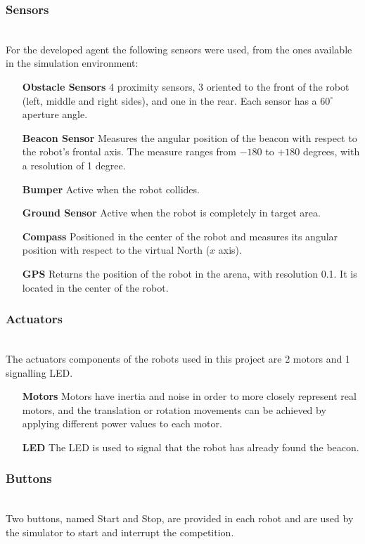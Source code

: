 \documentclass[oribibl]{llncs}
\begin{document}
\subsubsection{Sensors}\hfill \\
For the developed agent the following sensors were used, from the ones available in the simulation environment: 
\begin{itemize}
  \item[\textbf{Obstacle Sensors}]
  4 proximity sensors, 3 oriented to the front of the robot (left, middle and right sides), and one in the rear. Each sensor has a $60^{\circ}$ aperture angle.
  \item[\textbf{Beacon Sensor}]
  Measures the angular position of the beacon with respect to the robot's frontal axis. The measure ranges from $-180$ to $+180$ degrees, with a resolution of 1 degree.
  \item[\textbf{Bumper}]Active when the robot collides.
  \item[\textbf{Ground Sensor}]
  Active when the robot is completely in target area.
  \item[\textbf{Compass}]
  Positioned in the center of the robot and measures its angular position with respect to
the virtual North ($x$ axis).
  \item[\textbf{GPS}]
  Returns the position of the robot in the arena, with resolution 0.1. It is located in the center of the robot.
\end{itemize}

\subsubsection{Actuators}\hfill \\
The actuators components of the robots used in this project are 2 motors and 1 signalling LED. 
\begin{itemize}
  \item[\textbf{Motors}]
Motors have inertia and noise in order to more closely represent real motors, and the translation or rotation movements can be achieved by applying different power values to each motor.
  \item[\textbf{LED}]
The LED is used to signal that the robot has already found the beacon.
\end{itemize}

\subsubsection{Buttons}\hfill \\
Two buttons, named Start and Stop, are provided in each robot and are used by the simulator to start and interrupt the competition.
\end{document}

